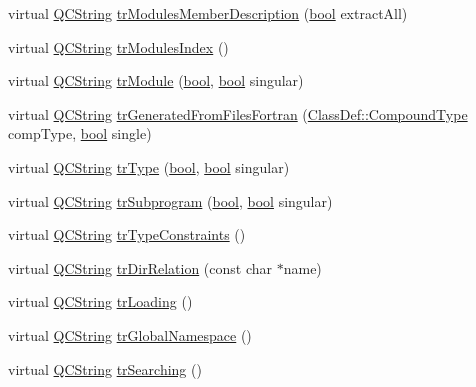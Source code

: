 \begin{DoxyCompactItemize}
virtual \hyperlink{class_q_c_string}{Q\+C\+String} \hyperlink{class_translator_korean_a9d1ea9e499810c8dbc812fc976cd583a}{tr\+Modules\+Member\+Description} (\hyperlink{qglobal_8h_a1062901a7428fdd9c7f180f5e01ea056}{bool} extract\+All)
\item 
virtual \hyperlink{class_q_c_string}{Q\+C\+String} \hyperlink{class_translator_korean_a27ed6bf015e7486973035b3a4dc79707}{tr\+Modules\+Index} ()
\item 
virtual \hyperlink{class_q_c_string}{Q\+C\+String} \hyperlink{class_translator_korean_a040e4dc351893d295b522fae7fa52ece}{tr\+Module} (\hyperlink{qglobal_8h_a1062901a7428fdd9c7f180f5e01ea056}{bool}, \hyperlink{qglobal_8h_a1062901a7428fdd9c7f180f5e01ea056}{bool} singular)
\item 
virtual \hyperlink{class_q_c_string}{Q\+C\+String} \hyperlink{class_translator_korean_a9fe58e5e96a6f39f6c2b702c4998b5da}{tr\+Generated\+From\+Files\+Fortran} (\hyperlink{class_class_def_ae70cf86d35fe954a94c566fbcfc87939}{Class\+Def\+::\+Compound\+Type} comp\+Type, \hyperlink{qglobal_8h_a1062901a7428fdd9c7f180f5e01ea056}{bool} single)
\item 
virtual \hyperlink{class_q_c_string}{Q\+C\+String} \hyperlink{class_translator_korean_a6cf3e25885e35207ff84754d5d684fa1}{tr\+Type} (\hyperlink{qglobal_8h_a1062901a7428fdd9c7f180f5e01ea056}{bool}, \hyperlink{qglobal_8h_a1062901a7428fdd9c7f180f5e01ea056}{bool} singular)
\item 
virtual \hyperlink{class_q_c_string}{Q\+C\+String} \hyperlink{class_translator_korean_a78b10bbfbcbdf7f747c0dc98944e2686}{tr\+Subprogram} (\hyperlink{qglobal_8h_a1062901a7428fdd9c7f180f5e01ea056}{bool}, \hyperlink{qglobal_8h_a1062901a7428fdd9c7f180f5e01ea056}{bool} singular)
\item 
virtual \hyperlink{class_q_c_string}{Q\+C\+String} \hyperlink{class_translator_korean_a40330c41363d6d093241961165b9da30}{tr\+Type\+Constraints} ()
\item 
virtual \hyperlink{class_q_c_string}{Q\+C\+String} \hyperlink{class_translator_korean_a4d9d74872c9696604dc312f9df8b2eb5}{tr\+Dir\+Relation} (const char $\ast$name)
\item 
virtual \hyperlink{class_q_c_string}{Q\+C\+String} \hyperlink{class_translator_korean_a16e71cfc77963d54b0b3c94c66e7a786}{tr\+Loading} ()
\item 
virtual \hyperlink{class_q_c_string}{Q\+C\+String} \hyperlink{class_translator_korean_a8678e9f40973a9741c3056712e369abc}{tr\+Global\+Namespace} ()
\item 
virtual \hyperlink{class_q_c_string}{Q\+C\+String} \hyperlink{class_translator_korean_a60b48444c1dd59762c5b3930204987db}{tr\+Searching} ()

\end{DoxyCompactItemize}
